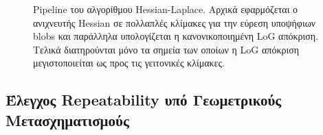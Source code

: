 \documentclass[12pt, a4paper]{article}
\begin{document}
\begin{figure}[H]
{%
  }                                                                                                                                                         
  \caption{Pipeline του αλγορίθμου Hessian-Laplace. Αρχικά εφαρμόζεται ο ανιχνευτής Hessian σε πολλαπλές κλίμακες για την εύρεση υποψήφιων blobs και παράλληλα υπολογίζεται η 
  κανονικοποιημένη LoG απόκριση. Τελικά διατηρούνται μόνο τα σημεία των οποίων η LoG απόκριση μεγιστοποιείται ως προς τις γειτονικές κλίμακες.}                               
  \label{fig:hessian_laplace_pipeline}                                                                                                                                        
  \end{figure} 

\subsection{Έλεγχος Repeatability υπό Γεωμετρικούς Μετασχηματισμούς}
\end{document}
